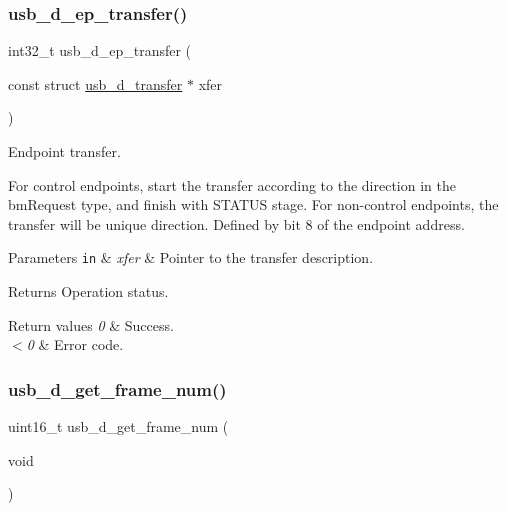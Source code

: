 \subsubsection{\texorpdfstring{usb\+\_\+d\+\_\+ep\+\_\+transfer()}{usb\_d\_ep\_transfer()}}
{\footnotesize\ttfamily int32\+\_\+t usb\+\_\+d\+\_\+ep\+\_\+transfer (\begin{DoxyParamCaption}\item[{const struct \hyperlink{structusb__d__transfer}{usb\+\_\+d\+\_\+transfer} $\ast$}]{xfer }\end{DoxyParamCaption})}



Endpoint transfer. 

For control endpoints, start the transfer according to the direction in the bm\+Request type, and finish with S\+T\+A\+T\+US stage. For non-\/control endpoints, the transfer will be unique direction. Defined by bit 8 of the endpoint address.


\begin{DoxyParams}[1]{Parameters}
\mbox{\tt in}  & {\em xfer} & Pointer to the transfer description. \\
\hline
\end{DoxyParams}
\begin{DoxyReturn}{Returns}
Operation status. 
\end{DoxyReturn}

\begin{DoxyRetVals}{Return values}
{\em 0} & Success. \\
\hline
{\em $<$0} & Error code. \\
\hline
\end{DoxyRetVals}
\mbox{\label{group__doc__driver__hal__usb__device_gaec972bc8924fc45ee34da6d4d55b91ff}} 
\subsubsection{\texorpdfstring{usb\+\_\+d\+\_\+get\+\_\+frame\+\_\+num()}{usb\_d\_get\_frame\_num()}}
{\footnotesize\ttfamily uint16\+\_\+t usb\+\_\+d\+\_\+get\+\_\+frame\+\_\+num (\begin{DoxyParamCaption}\item[{void}]{ }\end{DoxyParamCaption})}



